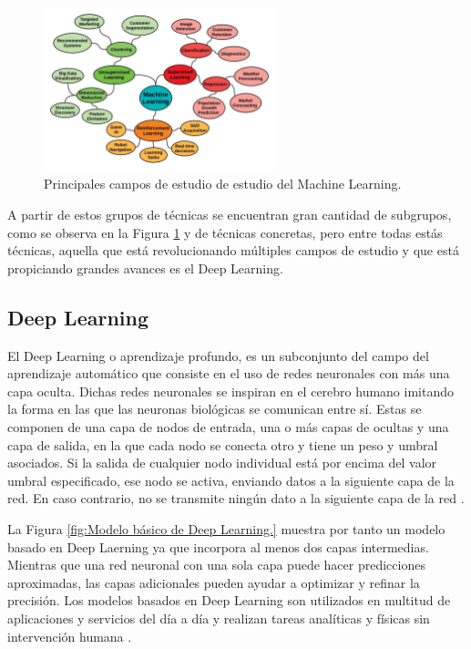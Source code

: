 \begin{figure}[H]
    \centering
    \includegraphics[width=0.6\textwidth]{Book/figures/1_introduccion/ml_techniques.png}
    \caption{Principales campos de estudio de estudio del Machine Learning.}
    \label{fig:Principales campos de estudio de estudio del Machine Learning.}
\end{figure}

A partir de estos grupos de técnicas se encuentran gran cantidad de subgrupos, como se observa en la Figura \ref{fig:Principales campos de estudio de estudio del Machine Learning.} y de técnicas concretas, pero entre todas estás técnicas, aquella que está revolucionando múltiples campos de estudio y que está propiciando grandes avances es el Deep Learning.

\subsection{Deep Learning}
\label{sec:Deep Learning}

El Deep Learning o aprendizaje profundo, es un subconjunto del campo del aprendizaje automático que consiste en el uso de redes neuronales con más una capa oculta. Dichas redes neuronales se inspiran en el cerebro humano imitando la forma en las que las neuronas biológicas se comunican entre sí. Estas se componen de una capa de nodos de entrada, una o más capas de ocultas y una capa de salida, en la que cada nodo se conecta otro y tiene un peso y umbral asociados. Si la salida de cualquier nodo individual está por encima del valor umbral especificado, ese nodo se activa, enviando datos a la siguiente capa de la red. En caso contrario, no se transmite ningún dato a la siguiente capa de la red \cite{what_nn}.

La Figura \ref{fig:Modelo básico de Deep Learning.} muestra por tanto un modelo basado en Deep Laerning ya que incorpora al menos dos capas intermedias. Mientras que una red neuronal con una sola capa puede hacer predicciones aproximadas, las capas adicionales pueden ayudar a optimizar y refinar la precisión. Los modelos basados en Deep Learning son utilizados en multitud de aplicaciones y servicios del día a día y realizan tareas analíticas y físicas sin intervención humana \cite{what_dl}. 

